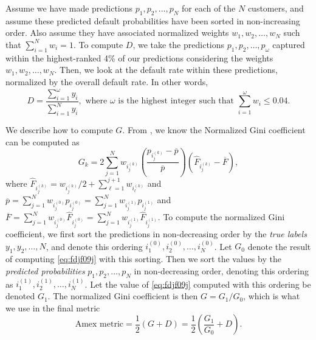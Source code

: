 \documentclass{statsmsc}
\begin{document}
{Assume we have made predictions $p_1,p_2,\dots,p_N$ for each of the $N$ customers, and assume these
predicted default probabilities have been sorted in non-increasing order. Also assume they have
associated normalized weights $w_1,w_2,\dots,w_N$ such that $\sum_{i=1}^N w_i=1$.
To compute $D$, we take the predictions $p_1,p_2,\dots,p_\omega$
captured within the highest-ranked 4\% of our predictions considering the
weights $w_1,w_2,\dots,w_N$. Then, we look at the default rate within these predictions, normalized
by the overall default rate. In other words,
\begin{equation}
    D= \frac{\sum^{\omega}_{i=1} y_i}{\sum^{N}_{i=1} y_i},
    \textrm{ where } \omega \textrm{ is the highest integer such that }
    \sum^{\omega}_{i=1} w_i \leq 0.04. %
\end{equation}

We describe how to compute $G$.
From \cite{gini}, we know the Normalized Gini coefficient can be computed as
\begin{equation}\label{eq:fdjf09j}
    G_k=2  \sum^{N}_{j=1} w_{i^{(k)}_j} \left(\frac{p_{i^{(k)}_j} - \overline{p}}{\overline{p}}\right)
    \left(\hat{F}_{i^{(k)}_j} - \overline{F} \right),
\end{equation}
where $\hat{F}_{i^{(k)}_j}={w_{i^{(k)}_j}}\big/{2} +\sum^{j+1}_{\ell=1}
w_{i^{(k)}_\ell}$ and $\overline{p}=\sum^{N}_{j=1} w_{i^{(0)}_j}
p_{i^{(0)}_j}=\sum^{N}_{j=1} w_{i^{(1)}_j} p_{i^{(1)}_j}$
and $\overline{F}=\sum^{N}_{j=1} w_{i^{(0)}_j}
\hat{F}_{i^{(0)}_j}=\sum^{N}_{j=1} w_{i^{(1)}_j} \hat{F}_{i^{(1)}_j} $.
To compute the normalized Gini coefficient, we first sort the predictions in non-decreasing order
by the \textit{true labels} $y_1,y_2,\dots,N$, and denote this ordering $i^{(0)}_1, i^{(0)}_2, \dots, i^{(0)}_N$.  Let $G_0$ denote the result of computing \cref{eq:fdjf09j} with this sorting.
Then we sort the values by the \textit{predicted probabilities} $p_1,p_2,\dots,p_N$ in non-decreasing order, denoting this ordering as $i^{(1)}_1, i^{(1)}_2, \dots, i^{(1)}_N$.
Let the value of \cref{eq:fdjf09j} computed with this ordering be denoted $G_1$.
The normalized Gini coefficient is then $G=G_1/G_0$, which is what we use in the final metric
\begin{equation}
    \textrm{Amex metric}=\frac{1}{2} \left(G +D \right)= \frac{1}{2} \left(\frac{G_1}{G_0}  +D \right).
\end{equation}

}
\end{document}
